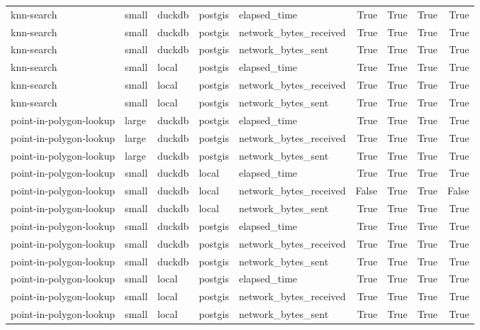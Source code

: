 \begin{tabular}{lllllrrrr}
knn-search & small & duckdb & postgis & elapsed\_time & True & True & True & True \\
knn-search & small & duckdb & postgis & network\_bytes\_received & True & True & True & True \\
knn-search & small & duckdb & postgis & network\_bytes\_sent & True & True & True & True \\
knn-search & small & local & postgis & elapsed\_time & True & True & True & True \\
knn-search & small & local & postgis & network\_bytes\_received & True & True & True & True \\
knn-search & small & local & postgis & network\_bytes\_sent & True & True & True & True \\
point-in-polygon-lookup & large & duckdb & postgis & elapsed\_time & True & True & True & True \\
point-in-polygon-lookup & large & duckdb & postgis & network\_bytes\_received & True & True & True & True \\
point-in-polygon-lookup & large & duckdb & postgis & network\_bytes\_sent & True & True & True & True \\
point-in-polygon-lookup & small & duckdb & local & elapsed\_time & True & True & True & True \\
point-in-polygon-lookup & small & duckdb & local & network\_bytes\_received & False & True & True & False \\
point-in-polygon-lookup & small & duckdb & local & network\_bytes\_sent & True & True & True & True \\
point-in-polygon-lookup & small & duckdb & postgis & elapsed\_time & True & True & True & True \\
point-in-polygon-lookup & small & duckdb & postgis & network\_bytes\_received & True & True & True & True \\
point-in-polygon-lookup & small & duckdb & postgis & network\_bytes\_sent & True & True & True & True \\
point-in-polygon-lookup & small & local & postgis & elapsed\_time & True & True & True & True \\
point-in-polygon-lookup & small & local & postgis & network\_bytes\_received & True & True & True & True \\
point-in-polygon-lookup & small & local & postgis & network\_bytes\_sent & True & True & True & True \\
\bottomrule
\end{tabular}
